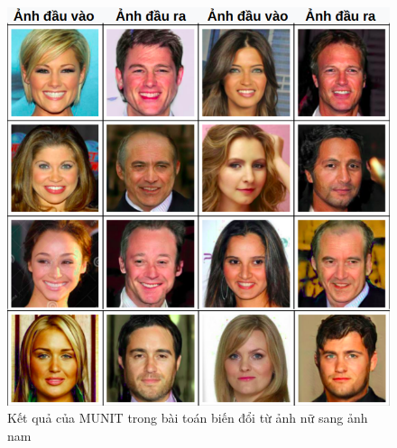 {    \begin{figure}[H]
    \centering
    \includegraphics[width=12cm] {images/result_our_female.png}
    \caption{Kết quả của MUNIT trong bài toán biến đổi từ ảnh nữ sang ảnh nam}
    \label{fig:result_our_female}
    \end{figure}
}